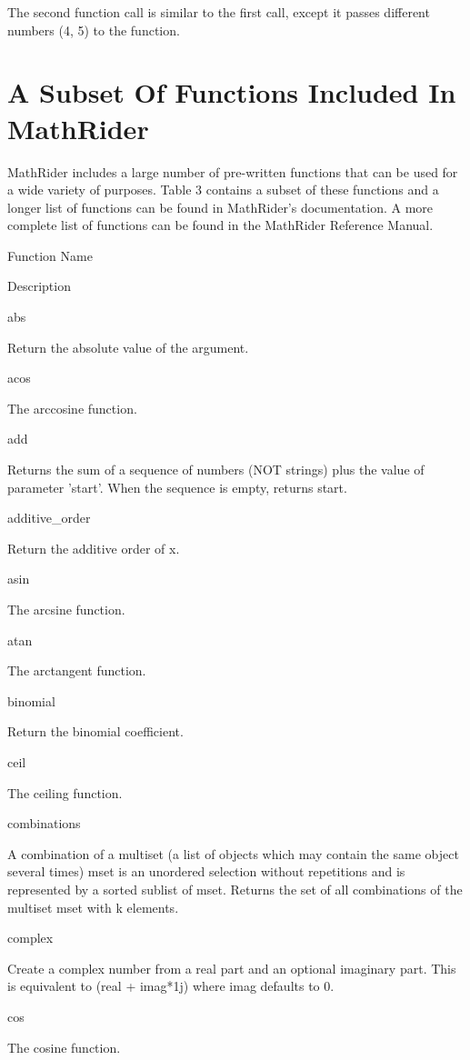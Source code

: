 \documentclass[12pt,oneside]{book}
\begin{document}
The second function call is similar to the first call, except it passes different numbers (4, 5) to the function.

\section[A Subset Of Functions Included In MathRider]{A Subset Of Functions Included In MathRider}

MathRider includes a large number of pre{}-written functions that can be used for a wide variety of purposes. Table 3 contains a subset of these functions and a longer list of functions can be found in MathRider's documentation. A more complete list of functions can be found in the MathRider Reference Manual.

Function Name

Description

abs

Return the absolute value of the argument.

acos

The arccosine function.

add

Returns the sum of a sequence of numbers (NOT strings) plus the value of parameter 'start'. When the sequence is empty, returns start.

additive\_order

Return the additive order of x.

asin 

The arcsine function.

atan

The arctangent function.

binomial

Return the binomial coefficient.

ceil

The ceiling function.

combinations

A combination of a multiset (a list of objects which may contain the same object several times) mset is an unordered selection without repetitions and is represented by a sorted sublist of mset. Returns the set of all combinations of the multiset mset with k elements.

complex

Create a complex number from a real part and an optional imaginary part. This is equivalent to (real + imag*1j) where imag defaults to 0.

cos

The cosine function.
\end{document}
